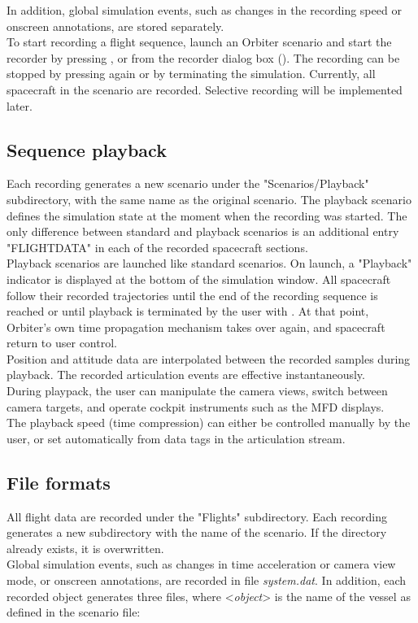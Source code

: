 \documentclass[Orbiter Technical Reference.tex]{subfiles}
\begin{document}
\noindent
In addition, global simulation events, such as changes in the recording speed or onscreen annotations, are stored separately.\\
To start recording a flight sequence, launch an Orbiter scenario and start the recorder by pressing \Ctrl{}, or from the recorder dialog box (\Ctrl{}). The recording can be stopped by pressing \Ctrl{} again or by terminating the simulation. Currently, all spacecraft in the scenario are recorded. Selective recording will be implemented later.


\subsection{Sequence playback}
Each recording generates a new scenario under the "Scenarios/Playback" subdirectory, with the same name as the original scenario. The playback scenario defines the simulation state at the moment when the recording was started. The only difference between standard and playback scenarios is an additional entry "FLIGHTDATA" in each of the recorded spacecraft sections.\\
Playback scenarios are launched like standard scenarios. On launch, a "Playback" indicator is displayed at the bottom of the simulation window. All spacecraft follow their recorded trajectories until the end of the recording sequence is reached or until playback is terminated by the user with \Ctrl{}. At that point, Orbiter's own time propagation mechanism takes over again, and spacecraft return to user control.\\
Position and attitude data are interpolated between the recorded samples during playback. The recorded articulation events are effective instantaneously.\\
During playpack, the user can manipulate the camera views, switch between camera targets, and operate cockpit instruments such as the MFD displays.\\
The playback speed (time compression) can either be controlled manually by the user, or set automatically from data tags in the articulation stream.


\subsection{File formats}
All flight data are recorded under the "Flights" subdirectory. Each recording generates a new subdirectory with the name of the scenario. If the directory already exists, it is overwritten.\\
Global simulation events, such as changes in time acceleration or camera view mode, or onscreen annotations, are recorded in file \textit{system.dat}. In addition, each recorded object generates three files, where <\textit{object}> is the name of the vessel as defined in the scenario file:
\end{document}
